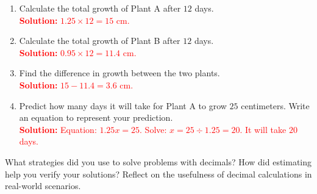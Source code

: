 \documentclass[11pt]{article}
\begin{document}
\begin{tcolorbox}[colframe=black!60, colback=white, 
coltitle=black, colbacktitle=black!15, fonttitle=\bfseries\Large, 
title=Performance Task: Monitoring Plant Growth - Answer Key, halign title=center, left=10pt, right=10pt, top=10pt, bottom=50pt]
\begin{enumerate}[itemsep=3em]
    \item Calculate the total growth of Plant A after \( 12 \) days.\\
    \textcolor{red}{\textbf{Solution:} \( 1.25 \times 12 = 15 \) cm.}

    \item Calculate the total growth of Plant B after \( 12 \) days.\\
    \textcolor{red}{\textbf{Solution:} \( 0.95 \times 12 = 11.4 \) cm.}

    \item Find the difference in growth between the two plants.\\
    \textcolor{red}{\textbf{Solution:} \( 15 - 11.4 = 3.6 \) cm.}

    \item Predict how many days it will take for Plant A to grow \( 25 \) centimeters. Write an equation to represent your prediction.\\
    \textcolor{red}{\textbf{Solution:} Equation: \( 1.25x = 25 \). Solve: \( x = 25 \div 1.25 = 20 \). It will take \( 20 \) days.}
\end{enumerate}
\end{tcolorbox}

\vspace{1em}

\begin{tcolorbox}[colframe=black!60, colback=white, 
coltitle=black, colbacktitle=black!15, fonttitle=\bfseries\Large, 
title=Reflection, halign title=center, left=10pt, right=10pt, top=10pt, bottom=100pt]
What strategies did you use to solve problems with decimals? How did estimating help you verify your solutions? Reflect on the usefulness of decimal calculations in real-world scenarios.
\end{tcolorbox}
\end{document}

